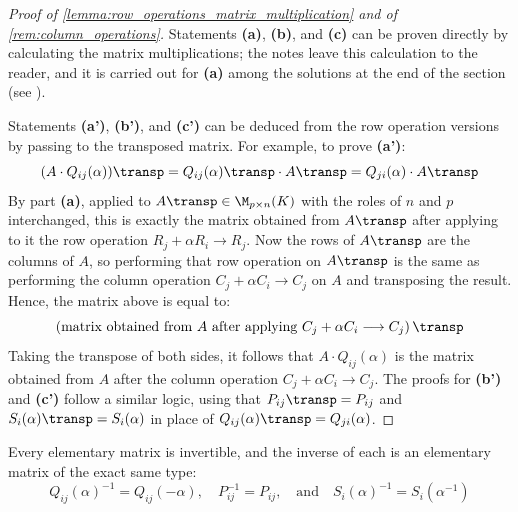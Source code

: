 \begin{proof}[Proof of \cref{lemma:row_operations_matrix_multiplication} and of \cref{rem:column_operations}]
Statements \textbf{(a)}, \textbf{(b)}, and \textbf{(c)} can be proven directly by calculating the matrix multiplications; the notes leave this calculation to the reader, and it is carried out for \textbf{(a)} among the solutions at the end of the section (see ).

Statements \textbf{(a')}, \textbf{(b')}, and \textbf{(c')} can be deduced from the row operation versions by passing to the transposed matrix. For example, to prove \textbf{(a')}:
\begin{equation*}
    (A \cdot Q_{ij}(\alpha))\transp = Q_{ij}(\alpha)\transp \cdot A\transp = Q_{ji}(\alpha) \cdot A\transp
\end{equation*}
By part \textbf{(a)}, applied to $A\transp \in \M_{p \times n}(K)$ with the roles of $n$ and $p$ interchanged, this is exactly the matrix obtained from $A\transp$ after applying to it the row operation $R_j + \alpha R_i \longrightarrow R_j$.
Now the rows of $A\transp$ are the columns of $A$, so performing that row operation on $A\transp$ is the same as performing the column operation $C_j + \alpha C_i \longrightarrow C_j$ on $A$ and transposing the result. Hence, the matrix above is equal to:
\begin{equation*}
    \left( \text{matrix obtained from } A \text{ after applying } C_j + \alpha C_i \longrightarrow C_j \right)\transp
\end{equation*}
Taking the transpose of both sides, it follows that $A \cdot Q_{ij}(\alpha)$ is the matrix obtained from $A$ after the column operation $C_j + \alpha C_i \longrightarrow C_j$. The proofs for \textbf{(b')} and \textbf{(c')} follow a similar logic, using that $P_{ij}\transp = P_{ij}$ and $S_i(\alpha)\transp = S_i(\alpha)$ in place of $Q_{ij}(\alpha)\transp = Q_{ji}(\alpha)$.
\end{proof}

\begin{lemma}
\label{lemma:elementary_matrix_inverses}
Every elementary matrix is invertible, and the inverse of each is an elementary matrix of the exact same type:
\begin{equation*}
    Q_{ij}(\alpha)^{-1} = Q_{ij}(-\alpha), \quad P_{ij}^{-1} = P_{ij}, \quad \text{and} \quad S_i(\alpha)^{-1} = S_i(\alpha^{-1})
\end{equation*}
\end{lemma}

